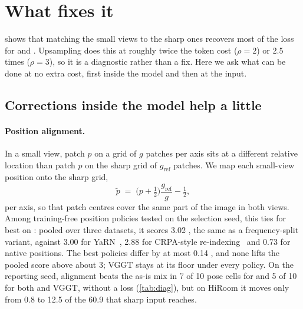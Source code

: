\section{What fixes it}
\label{sec:fixes}

 shows that matching the small views to the sharp ones recovers most of the loss for \pithree and \dathree. Upsampling does this at roughly twice the token cost ($\rho{=}2$) or 2.5 times ($\rho{=}3$), so it is a diagnostic rather than a fix. Here we ask what can be done at no extra cost, first inside the model and then at the input.

\subsection{Corrections inside the model help a little}

\paragraph{Position alignment.}
In a small view, patch $p$ on a grid of $g$ patches per axis sits at a different relative location than patch $p$ on the sharp grid of $g_{\mathrm{ref}}$ patches. We map each small-view position onto the sharp grid,
\begin{equation}
  \tilde p \;=\; \Big(p+\tfrac12\Big)\frac{g_{\mathrm{ref}}}{g} - \tfrac12 ,
  \label{eq:align}
\end{equation}
per axis, so that patch centres cover the same part of the image in both views. Among training-free position policies tested on the selection seed, this ties for best on \pithree: pooled over three datasets, it scores 3.02 \auc, the same as a frequency-split variant, against 3.00 for YaRN~\cite{peng2023yarn}, 2.88 for CRPA-style re-indexing~\cite{crpa2025} and 0.73 for native positions. The best policies differ by at most 0.14 \auc, and none lifts the pooled score above about 3; VGGT stays at its floor under every policy. On the reporting seed, alignment beats the as-is mix in 7 of 10 pose cells for \pithree and 5 of 10 for both \dathree and VGGT, without a loss (\cref{tab:diag}), but on HiRoom it moves \pithree only from 0.8 to 12.5 of the 60.9 that sharp input reaches.

